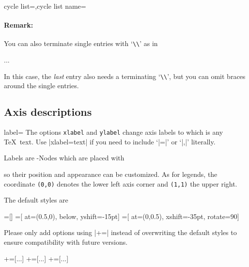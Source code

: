\begin{pgfplotskeylist}{cycle list=,cycle list name=}
\paragraph{Remark:} You can also terminate single entries with `\lstinline!\\!' as in
\begin{codeexample}
\begin{axis}[cycle list={%
	blue,mark=*\\%
	red,mark=square\\%
	dashed,mark=o\\%
	loosely dotted,mark=+\\%
	brown!60!black,
		mark options={fill=brown!40},
		mark=otimes*\\}
]
...
\end{axis}
\end{codeexample}
In this case, the \emph{last} entry also needs a terminating `\lstinline!\\!', but you can omit braces around the single entries.
\end{pgfplotskeylist}




\subsection{Axis descriptions}

\begin{pgfplotsxykey}{\x label=}
The options \texttt{xlabel} and \texttt{ylabel} change axis labels to  which is any \TeX\ text. Use |xlabel={text}| if you need to include `|=|' or `|,|' literally.

Labels are \Tikz-Nodes which are placed with
\begin{codeexample}
\node 
	[style=every axis label,
	style=every axis x label]
\node 
	[style=every axis label,
	style=every axis y label] 
\end{codeexample}
so their position and appearance can be customized. As for legends, the coordinate \lstinline!(0,0)! denotes the lower left axis corner and \lstinline!(1,1)! the upper right. 

The default styles are
\begin{codeexample}
=[]
=[
	at={(0.5,0)},
	below,
	yshift=-15pt]
=[
	at={(0,0.5)},
	xshift=-35pt,
	rotate=90]
\end{codeexample}
Please only add options using |+=| instead of overwriting the default styles to ensure compatibility with future versions.
\begin{codeexample}
+=[...]
+=[...]
+=[...]
\end{codeexample}
\end{pgfplotsxykey}

